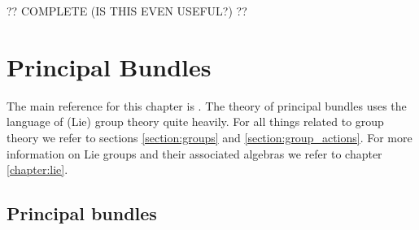 
    ?? COMPLETE (IS THIS EVEN USEFUL?) ??



\chapter{Principal Bundles}\label{chapter:principal_bundles}

    The main reference for this chapter is \cite{principal_bundles}. The theory of principal bundles uses the language of (Lie) group theory quite heavily. For all things related to group theory we refer to sections \ref{section:groups} and \ref{section:group_actions}. For more information on Lie groups and their associated algebras we refer to chapter \ref{chapter:lie}.

\section{Principal bundles}

